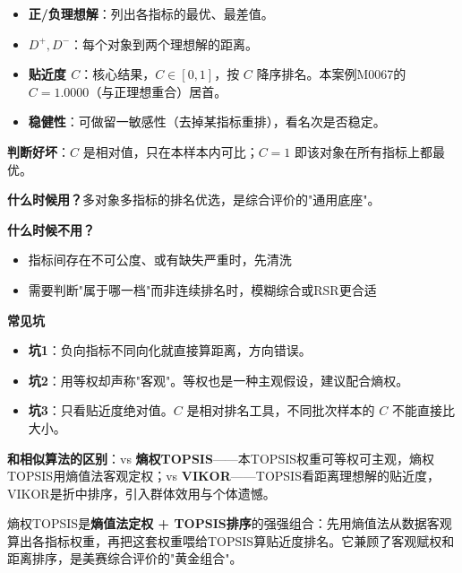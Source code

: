 \begin{algoresult}
\begin{itemize}
    \item \textbf{正/负理想解}：列出各指标的最优、最差值。
    \item \textbf{$D^+,D^-$}：每个对象到两个理想解的距离。
    \item \textbf{贴近度 $C$}：核心结果，$C\in[0,1]$，按 $C$ 降序排名。本案例M0067的 $C=1.0000$（与正理想重合）居首。
    \item \textbf{稳健性}：可做留一敏感性（去掉某指标重排），看名次是否稳定。
\end{itemize}

\textbf{判断好坏}：$C$ 是相对值，只在本样本内可比；$C=1$ 即该对象在所有指标上都最优。
\end{algoresult}

\begin{algonotes}
\textbf{什么时候用？}多对象多指标的排名优选，是综合评价的"通用底座"。

\textbf{什么时候不用？}
\begin{itemize}
    \item 指标间存在不可公度、或有缺失严重时，先清洗
    \item 需要判断"属于哪一档"而非连续排名时，模糊综合或RSR更合适
\end{itemize}

\textbf{常见坑}
\begin{itemize}
    \item \textbf{坑1}：负向指标不同向化就直接算距离，方向错误。
    \item \textbf{坑2}：用等权却声称"客观"。等权也是一种主观假设，建议配合熵权。
    \item \textbf{坑3}：只看贴近度绝对值。$C$ 是相对排名工具，不同批次样本的 $C$ 不能直接比大小。
\end{itemize}

\textbf{和相似算法的区别}：vs \textbf{熵权TOPSIS}——本TOPSIS权重可等权可主观，熵权TOPSIS用熵值法客观定权；vs \textbf{VIKOR}——TOPSIS看距离理想解的贴近度，VIKOR是折中排序，引入群体效用与个体遗憾。
\end{algonotes}


\begin{algointro}
熵权TOPSIS是\textbf{熵值法定权 + TOPSIS排序}的强强组合：先用熵值法从数据客观算出各指标权重，再把这套权重喂给TOPSIS算贴近度排名。它兼顾了客观赋权和距离排序，是美赛综合评价的"黄金组合"。
\end{algointro}

